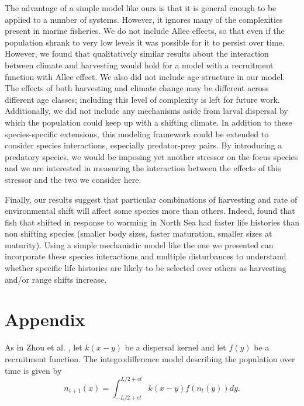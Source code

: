\documentclass[12pt,english]{article}
\begin{document}
The advantage of a simple model like ours is that it is general enough to be applied to a number of systems.  However, it  ignores many of the complexities present in marine fisheries. We do not include Allee effects, so that even if the population shrank to very low levels it was possible for it to persist over time. However, we found that qualitatively similar results about the interaction between climate and harvesting would hold for a model with a recruitment function with Allee effect. We also did not include age structure in our model. The effects of both harvesting and climate change may be different across different age classes; including this level of complexity is left for future work. Additionally, we did not include any mechanisms aside from larval dispersal by which the population could keep up with a shifting climate.  In addition to these species-specific extensions, this modeling framework could be extended to consider species interactions, especially predator-prey pairs.  By introducing a predatory species, we would be imposing yet another stressor on the focus species \citep{Lingetal2009, Gurevitchetal2000}and we are interested in measuring the interaction between the effects of this stressor and the two we consider here.

Finally, our results suggest that particular combinations of harvesting and rate of environmental shift will affect some species more than others. Indeed, \citet{Perryetal2005} found that fish that shifted in response to warming in North Sea had faster life histories than non shifting species (smaller body sizes, faster maturation, smaller sizes at maturity). Using a simple mechanistic model like the one we presented can incorporate these species interactions and multiple disturbances to understand whether specific life histories are likely to be selected over others as harvesting and/or range shifts increase.



\section{Appendix}

As in Zhou et al. \citep{ZhouKot2011}, let $k(x-y)$ be a dispersal kernel and let $f(y)$ be a recruitment function.  The integrodifference model describing the population over time is given by 
\begin{equation} n_{t+1}(x)=\int_{-L/2+ct}^{L/2+ct}k(x-y)f(n_t(y))dy. \label{integro} \end{equation}
\end{document}

